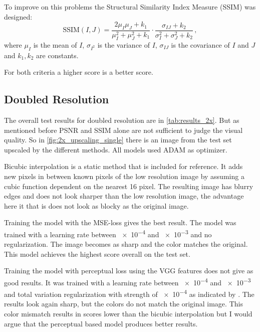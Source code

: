 \documentclass{scrartcl}
\begin{document}
To improve on this problems the Structural Similarity Index Measure (SSIM) was designed:
\[
	\mathrm{SSIM}(I, J)
	= \frac{2\mu_I\mu_J + k_1}{\mu_I^2+\mu_J^2+k_1} \cdot \frac{\sigma_{IJ} + k_2}{\sigma_I^2 + \sigma_J^2 + k_2}
	\,,
\]
where \( \mu_I \) is the mean of \( I \), \( \sigma_{I^2} \) is the variance of \( I \), \( \sigma_{IJ} \) is the covariance of \( I \) and \( J \) and \( k_1, k_2 \) are constants.

For both criteria a higher score is a better score.

\subsection{Doubled Resolution}

The overall test results for doubled resolution are in \cref{tab:results_2x}.
But as mentioned before PSNR and SSIM alone are not sufficient to judge the visual quality.
So in \cref{fig:2x_upscaling_single} there is an image from the test set upscaled by the different methods.
All models used ADAM as optimizer.

Bicubic interpolation is a static method that is included for reference.
It adds new pixels in between known pixels of the low resolution image by assuming a cubic function dependent on the nearest \num{16} pixel.
The resulting image has blurry edges and does not look sharper than the low resolution image, the advantage here it that is does not look as blocky as the original image.

Training the model with the MSE-loss gives the best result.
The model was trained with a learning rate between \num{e-4} and \num{e-3} and no regularization.
The image becomes as sharp and the color matches the original. 
This model achieves the highest score overall on the test set.

Training the model with perceptual loss using the VGG features does not give as good results.
It was trained with a learning rate between \num{e-4} and \num{e-3} and total variation regularization with strength of \num{e-4} as indicated by \textcite{perceptual_loss}.
The results look again sharp, but the colors do not match the original image.
This color mismatch results in scores lower than the bicubic interpolation but I would argue that the perceptual based model produces better results.
\end{document}

